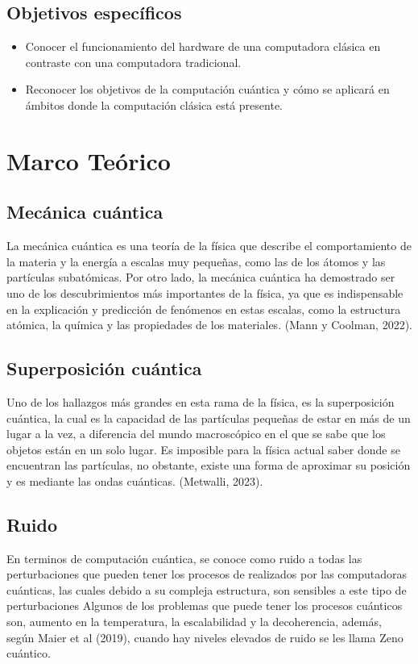 \documentclass{article}
\begin{document}
\subsection{Objetivos específicos}

\begin{itemize}
	\item Conocer el funcionamiento del hardware de una computadora clásica en contraste con una computadora tradicional.
	\item Reconocer los objetivos de la computación cuántica y cómo se aplicará en ámbitos donde la computación clásica está presente.
\end{itemize}

\newpage
\section{Marco Teórico}
\subsection{Mecánica cuántica} 
La mecánica cuántica es una teoría de la física que describe el comportamiento de la materia y la energía a escalas muy pequeñas, como las de los átomos y las partículas subatómicas. Por otro lado, la mecánica cuántica ha demostrado ser uno de los descubrimientos más importantes de la física, ya que es indispensable en la explicación y predicción de fenómenos en estas escalas, como la estructura atómica, la química y las propiedades de los materiales. (Mann y Coolman, 2022).

\subsection{Superposición cuántica} 
Uno de los hallazgos más grandes en esta rama de la física, es la superposición cuántica, la cual es la capacidad de las partículas pequeñas de estar en más de un lugar a la vez, a diferencia del mundo macroscópico en el que se sabe que los objetos están en un solo lugar. Es imposible para la física actual saber donde se encuentran las partículas, no obstante, existe una forma de aproximar su posición y es mediante las ondas cuánticas. (Metwalli, 2023).

\subsection{Ruido}
En terminos de computación cuántica, se conoce como ruido a todas las perturbaciones que pueden tener los procesos de realizados por las computadoras cuánticas, las cuales debido a su compleja estructura, son sensibles a este tipo de perturbaciones Algunos de los problemas que puede tener los procesos cuánticos son, aumento en la temperatura, la escalabilidad y la decoherencia, además, según Maier et al (2019), cuando hay niveles elevados de ruido se les llama Zeno cuántico. 
\end{document}
